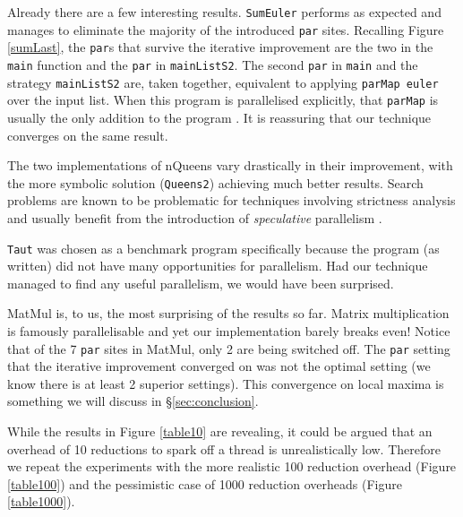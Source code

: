 Already there are a few interesting results. \texttt{SumEuler} performs as expected and
manages to eliminate the majority of the introduced \verb-par- sites. Recalling
Figure \ref{sumLast}, the \verb-par-s that survive the iterative improvement
are the two in the \verb-main- function and the \verb-par- in \verb-mainListS2-.
The second \verb-par- in \verb-main- and the strategy \verb-mainListS2- are,
taken together, equivalent to applying \verb-parMap euler- over the input list.
When this program is parallelised explicitly, that \verb-parMap- is usually the
only addition to the program \citep{vGMachine}. It is reassuring that our
technique converges on the same result.

The two implementations of nQueens vary drastically in their improvement, with
the more symbolic solution (\texttt{Queens2}) achieving much better results. Search
problems are known to be problematic for techniques involving strictness
analysis and usually benefit from the introduction of \emph{speculative}
parallelism \citep{hammond2000research}.

\texttt{Taut} was chosen as a benchmark program specifically because the program (as
written) did not have many opportunities for parallelism. Had our technique
managed to find any useful parallelism, we would have been surprised.

MatMul is, to us, the most surprising of the results so far. Matrix
multiplication is famously parallelisable and yet our implementation
barely breaks even! Notice that of the 7 \verb-par- sites in MatMul, only
2 are being switched off. The \verb-par- setting that the iterative
improvement converged on was not the optimal setting (we know there is at least
2 superior settings). This convergence on local maxima is something we will
discuss in \S\ref{sec:conclusion}.

While the results in Figure \ref{table10} are revealing, it could be argued that
an overhead of 10 reductions to spark off a thread is unrealistically low.
Therefore we repeat the experiments with the more realistic 100 reduction
overhead (Figure \ref{table100}) and the pessimistic case of 1000 reduction
overheads (Figure \ref{table1000}).

